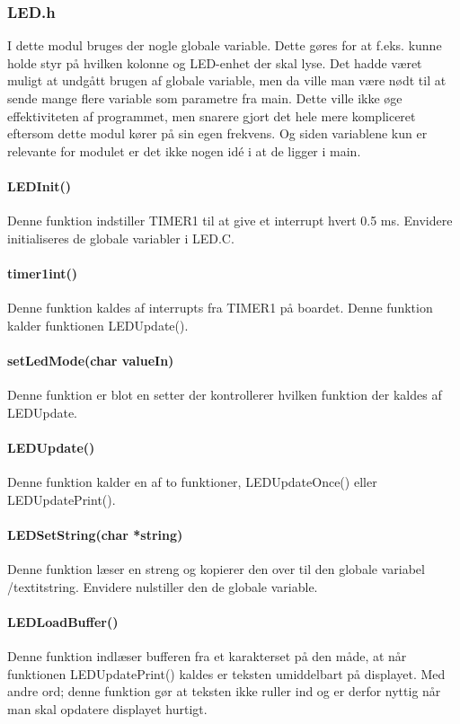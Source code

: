 \subsubsection{LED.h}
I dette modul bruges der nogle globale variable. Dette gøres for at f.eks. kunne holde styr på hvilken kolonne og LED-enhet der skal lyse. Det hadde været muligt at undgått brugen af globale variable, men da ville man være nødt til at sende mange flere variable som parametre fra main. Dette ville ikke øge effektiviteten af programmet, men snarere gjort det hele mere kompliceret eftersom dette modul kører på sin egen frekvens. Og siden variablene kun er relevante for modulet er det ikke nogen idé i at de ligger i main.

\paragraph{LEDInit()}
Denne funktion indstiller TIMER1 til at give et interrupt hvert 0.5 ms. Envidere initialiseres de globale variabler i LED.C.

\paragraph{timer1int()}
Denne funktion kaldes af interrupts fra TIMER1 på boardet. Denne funktion kalder funktionen LEDUpdate().

\paragraph{setLedMode(char valueIn)}
Denne funktion er blot en setter der kontrollerer hvilken funktion der kaldes af LEDUpdate.

\paragraph{LEDUpdate()}
Denne funktion kalder en af to funktioner, LEDUpdateOnce() eller LEDUpdatePrint().

\paragraph{LEDSetString(char *string)}
Denne funktion læser en streng  og kopierer den over til den globale variabel /textit{string}. Envidere nulstiller den de globale variable.

\paragraph{LEDLoadBuffer()}
Denne funktion indlæser bufferen fra et karakterset på den måde, at når funktionen LEDUpdatePrint() kaldes er teksten umiddelbart på displayet. Med andre ord; denne funktion gør at teksten ikke ruller ind og er derfor nyttig når man skal opdatere displayet hurtigt.

